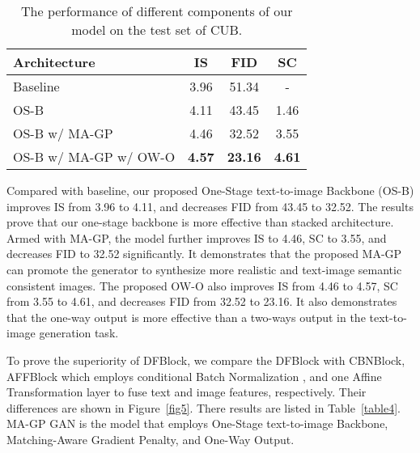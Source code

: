 \documentclass[10pt,twocolumn,letterpaper]{article}
\begin{document}
\begin{table}[t] \small
\centering
\caption{The performance of different components of our model on the test set of CUB.}
\begin{tabular}{l|c|c|c}\toprule
Architecture        &IS    &FID       &SC  \\ \midrule
Baseline            & 3.96           & 51.34                & -\\
OS-B                & 4.11           & 43.45                & 1.46\\
OS-B w/ MA-GP    & 4.46           & 32.52                & 3.55\\
OS-B w/ MA-GP w/ OW-O & \textbf{4.57}  & \textbf{23.16} & \textbf{4.61}\\ \bottomrule
\end{tabular}
\label{table3}
\vspace{-0.4cm}
\end{table}

Compared with baseline, our proposed One-Stage text-to-image Backbone (OS-B) improves IS from 3.96 to 4.11, and decreases FID from 43.45 to 32.52. 
The results prove that our one-stage backbone is more effective than stacked architecture.
Armed with MA-GP, the model further improves IS to 4.46, SC to 3.55, and decreases FID to 32.52 significantly. 
It demonstrates that the proposed MA-GP can promote the generator to synthesize more realistic and text-image semantic consistent images.
The proposed OW-O also improves IS from 4.46 to 4.57, SC from 3.55 to 4.61, and decreases FID from 32.52 to 23.16. 
It also demonstrates that the one-way output is more effective than a two-ways output in the text-to-image generation task. 

To prove the superiority of DFBlock, we compare the DFBlock with CBNBlock, AFFBlock which employs conditional Batch Normalization \cite{de2017modulating, miyato2018cgans, brock2018large}, and one Affine Transformation layer to fuse text and image features, respectively. 
Their differences are shown in Figure~\ref{fig5}. 
There results are listed in Table~\ref{table4}.
MA-GP GAN is the model that employs One-Stage text-to-image Backbone, Matching-Aware Gradient Penalty, and One-Way Output.
\end{document}
